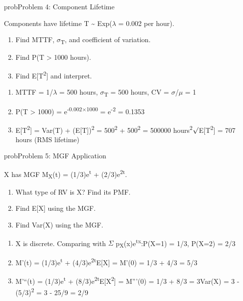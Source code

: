 \begin{PSbox}[unbreakable]{prob}{Problem 4: Component Lifetime}

Components have lifetime T \textasciitilde{} Exp(\ensuremath{\lambda} = 0.002 per hour).

\begin{enumerate}
\def\labelenumi{(\alph{enumi})}
\tightlist
\item
  Find MTTF, \ensuremath{\sigma}\textsubscript{T}, and coefficient of variation.
\item
  Find P(T \textgreater{} 1000 hours).
\item
  Find E[T\textsuperscript{2}] and interpret.
\end{enumerate}

\PSsolution{} 

\begin{enumerate}
\def\labelenumi{(\alph{enumi})}
\item
  MTTF = 1/\ensuremath{\lambda} = 500 hours, \ensuremath{\sigma}\textsubscript{T} = 500 hours, CV = \ensuremath{\sigma}/\ensuremath{\mu} = 1
\item
  P(T \textgreater{} 1000) = e\textsuperscript{-0.002\ensuremath{\times}1000} = e\textsuperscript{-2} = 0.1353
\item
  E[T\textsuperscript{2}] = Var(T) + (E[T])\textsuperscript{2} = 500\textsuperscript{2} + 500\textsuperscript{2} = 500000 hours\textsuperscript{2}\PSbr{}\ensuremath{\surd}E[T\textsuperscript{2}] = 707 hours (RMS lifetime)
\end{enumerate}

\end{PSbox}

\begin{PSbox}[unbreakable]{prob}{Problem 5: MGF Application}

X has MGF M\textsubscript{X}(t) = (1/3)e\textsuperscript{t} + (2/3)e\textsuperscript{2t}.

\begin{enumerate}
\def\labelenumi{(\alph{enumi})}
\tightlist
\item
  What type of RV is X? Find its PMF.
\item
  Find E[X] using the MGF.
\item
  Find Var(X) using the MGF.
\end{enumerate}

\PSsolution{} 

\begin{enumerate}
\def\labelenumi{(\alph{enumi})}
\item
  X is discrete. Comparing with \ensuremath{\Sigma} p\textsubscript{X}(x)e\textsuperscript{tx}:\PSbr{}P(X=1) = 1/3, P(X=2) = 2/3
\item
  M’(t) = (1/3)e\textsuperscript{t} + (4/3)e\textsuperscript{2t}\PSbr{}E[X] = M’(0) = 1/3 + 4/3 = 5/3
\item
  M’``(t) = (1/3)e\textsuperscript{t} + (8/3)e\textsuperscript{2t}\PSbr{}E[X\textsuperscript{2}] = M''’(0) = 1/3 + 8/3 = 3\PSbr{}Var(X) = 3 - (5/3)\textsuperscript{2} = 3 - 25/9 = 2/9
\end{enumerate}

\end{PSbox}

